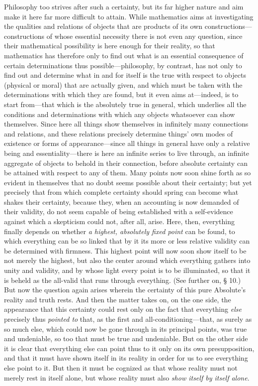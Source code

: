 \documentclass[12pt,a4paper]{book}
\begin{document}
Philosophy too strives after such a certainty, but its far higher nature and aim
make it here far more difficult to attain. While mathematics aims at investigating
the qualities and relations of objects that are products of its own
constructions---constructions of whose essential necessity there is not even any
question, since their mathematical possibility is here enough for their reality,
so that mathematics has therefore only to find out what is an essential
consequence of certain determinations thus possible---philosophy, by contrast, has
not only to find out and determine what in and for itself is the true with respect
to objects (physical or moral) that are actually given, and which must be taken
with the determinations with which they are found, but it even aims at---indeed,
is to start from---that which is the absolutely true in general, which underlies
all the conditions and determinations with which any objects whatsoever can show
themselves. Since here all things show themselves in infinitely many connections
and relations, and these relations precisely determine things' own modes of
existence or forms of appearance---since all things in general have only a
relative being and essentiality---there is here an infinite series to live
through, an infinite aggregate of objects to behold in their connection, before
absolute certainty can be attained with respect to any of them. Many points now
soon shine forth as so evident in themselves that no doubt seems possible about
their certainty; but yet precisely that from which complete certainty should
spring can become what shakes their certainty, because they, when an accounting is
now demanded of their validity, do not seem capable of being established with a
self-evidence against which a skepticism could not, after all, arise. Here, then,
everything finally depends on whether \emph{a highest, absolutely fixed point} can
be found, to which everything can be so linked that by it its more or less
relative validity can be determined with firmness. This highest point will now
soon show itself to be not merely the highest, but also the center around which
everything gathers into unity and validity, and by whose light every point is to
be illuminated, so that it is beheld as the all-valid that runs through
everything. (See further on, § 10.) But now the question again arises wherein the
certainty of this pure Absolute's reality and truth rests. And then the matter
takes on, on the one side, the appearance that this certainty could rest only on
the fact that everything \emph{else} precisely thus \emph{pointed to} that, as the
first and all-conditioning---that, as surely as so much else, which could now be
gone through in its principal points, was true and undeniable, so too that must be
true and undeniable. But on the other side it is clear that everything else can
point thus to it only on its own presupposition, and that it must have shown
itself in its reality in order for us to see everything else point to it. But then
it must be cognized as that whose reality must not merely rest in itself alone, but
whose reality must also \emph{show itself by itself alone}.
\end{document}
